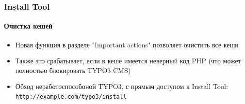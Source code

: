 
\begin{frame}[fragile]
	\frametitle{Install Tool}
	\framesubtitle{Очистка кешей}

	\begin{itemize}
		\item Новая функция в разделе "Important actions" позволяет очистить все кеши
		\item Также это срабатывает, если в кеше имеется неверный код PHP\newline
			(что может полностью блокировать TYPO3 CMS)
		\item Обход неработоспособоной TYPO3, с прямым доступом к Install Tool: \texttt{http://example.com/typo3/install}
	\end{itemize}


\end{frame}
